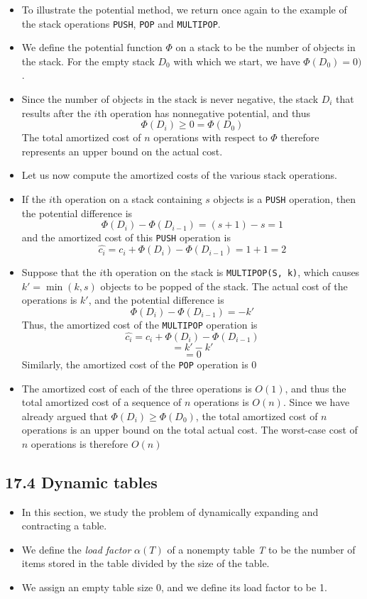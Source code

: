 \documentclass{report}
\begin{document}
\begin{itemize}
    \item To illustrate the potential method, we return once again to the example of the stack operations \texttt{PUSH}, \texttt{POP} and \texttt{MULTIPOP}.
    \item We define the potential function $\Phi$ on a stack to be the number of objects in the stack. For the empty stack $D_0$ with which we start, we have $\Phi(D_0) = 0)$.
    \item Since the number of objects in the stack is never negative, the stack $D_i$ that results after the $i$th operation has nonnegative potential, and thus 
    $$\Phi(D_i) \geq 0 = \Phi(D_0)$$
    The total amortized cost of $n$ operations with respect to $\Phi$ therefore represents an upper bound on the actual cost.
    \item Let us now compute the amortized costs of the various stack operations.
    \item If the $i$th operation on a stack containing $s$ objects is a \texttt{PUSH} operation, then the potential difference is 
    $$\Phi(D_i) - \Phi(D_{i - 1}) = (s + 1) - s = 1$$
    and the amortized cost of this \texttt{PUSH} operation is
    $$\hat{c_i} = c_i + \Phi(D_i) - \Phi(D_{i - 1}) = 1 + 1 = 2$$
    \item Suppose that the $i$th operation on the stack is \texttt{MULTIPOP(S, k)}, which causes $k' = \min(k, s)$ objects to be popped of the stack. The actual cost of the operations is $k'$, and the potential difference is
    $$\Phi(D_i) - \Phi(D_{i - 1}) = -k'$$
    Thus, the amortized cost of the \texttt{MULTIPOP} operation is 
    $$\hat{c_i} = c_i + \Phi(D_i) - \Phi(D_{i - 1})$$
    $$ = k' - k'$$
    $$ = 0$$
    Similarly, the amortized cost of the \texttt{POP} operation is 0
    \item The amortized cost of each of the three operations is $O(1)$, and thus the total amortized cost of a sequence of $n$ operations is $O(n)$. Since we have already argued that $\Phi(D_i) \geq \Phi(D_0)$, the total amortized cost of $n$ operations is an upper bound on the total actual cost. The worst-case cost of $n$ operations is therefore $O(n)$
\end{itemize}
\subsection*{17.4 Dynamic tables}
\begin{itemize}
    \item In this section, we study the problem of dynamically expanding and contracting a table.
    \item We define the \textit{load factor} $\alpha(T)$ of a nonempty table \textit{T} to be the number of items stored in the table divided by the size of the table.
    \item We assign an empty table size 0, and we define its load factor to be 1.
\end{itemize}
\end{document}
